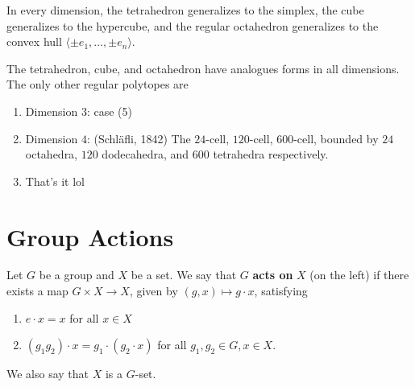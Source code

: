 In every dimension, the tetrahedron generalizes to the simplex, the cube generalizes to the hypercube, and the regular octahedron generalizes to the convex hull $\langle \pm e_1,\dots, \pm e_n\rangle$.

\begin{rmk}
    The tetrahedron, cube, and octahedron have analogues forms in all dimensions. The only other regular polytopes are
    \begin{enumerate}
        \item Dimension $3$: case (5)
        \item Dimension $4$: (Schläfli, 1842) The $24$-cell, $120$-cell, $600$-cell, bounded by $24$ octahedra, $120$ dodecahedra, and $600$ tetrahedra respectively.
        \item That's it lol
    \end{enumerate}
\end{rmk}

\section{Group Actions}

\begin{defn}
    Let $G$ be a group and $X$ be a set. We say that $G$ \textbf{acts on} $X$ (on the left) if there exists a map $G \times X \to X$, given by $(g,x) \mapsto g\cdot x$, satisfying
    \begin{enumerate}
        \item[(i)] $e\cdot x=x$ for all $x \in X$
        \item[(ii)] $(g_1g_2)\cdot x=g_1\cdot(g_2\cdot x)$ for all $g_1,g_2\in G,x \in X$.
    \end{enumerate}
    We also say that $X$ is a $G$-set.
\end{defn}


